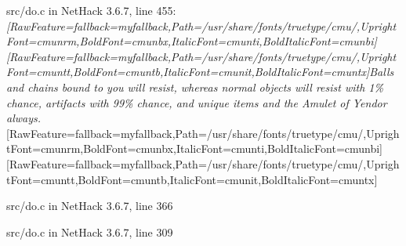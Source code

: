 \begin{myenumerate}
\item{} src/do.c in NetHack 3.6.7, line 455\footnotemark[168]: {\itshape \allowbreak{}\setmainfont{cmunti.ttf}[RawFeature={fallback=myfallback},Path=/usr/share/fonts/truetype/cmu/,UprightFont=cmunrm,BoldFont=cmunbx,ItalicFont=cmunti,BoldItalicFont=cmunbi]\setmonofont{cmunti.ttf}[RawFeature={fallback=myfallback},Path=/usr/share/fonts/truetype/cmu/,UprightFont=cmuntt,BoldFont=cmuntb,ItalicFont=cmunit,BoldItalicFont=cmuntx]\itshape Balls and chains bound to you will resist, whereas normal objects will resist with 1\% chance, artifacts with 99\% chance, and unique items\footnotemark[169] and the Amulet of Yendor\footnotemark[170] always.}\allowbreak{}\setmainfont{cmunrm.ttf}[RawFeature={fallback=myfallback},Path=/usr/share/fonts/truetype/cmu/,UprightFont=cmunrm,BoldFont=cmunbx,ItalicFont=cmunti,BoldItalicFont=cmunbi]\setmonofont{cmunrm.ttf}[RawFeature={fallback=myfallback},Path=/usr/share/fonts/truetype/cmu/,UprightFont=cmuntt,BoldFont=cmuntb,ItalicFont=cmunit,BoldItalicFont=cmuntx]
\item{} src/do.c in NetHack 3.6.7, line 366\footnotemark[171]
\item{} src/do.c in NetHack 3.6.7, line 309\footnotemark[172]
\item{} \footnotemark[173]
\end{myenumerate}
